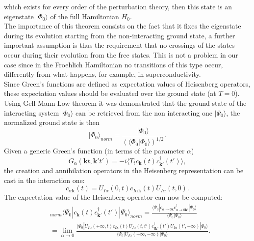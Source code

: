 which exists for every order of the perturbation theory, then this state is an eigenstate $|\Phi_0\rangle$ of the full Hamiltonian $H_0$.\\
The importance of this theorem consists on the fact that it fixes the eigenstate during its evolution starting from the non-interacting ground 
state, a further important assumption is thus the requirement that no crossings of the states occur during their evolution from the free states. This is not 
a problem in our case since in the Froehlich Hamiltonian no transitions of this type occur, differently from what happens, for example, 
in superconductivity.\\
Since Green's functions are defined as expectation values of Heisenberg operators, these expectation values should be evaluated over the ground state (at $T=0$). 
Using Gell-Mann-Low theorem it was demonstrated that the ground state of the interacting system $|\Phi_0\rangle$ can be retrieved from the non interacting one $|\Psi_0\rangle$, 
the normalized ground state is then
\begin{equation}
    |\Phi_0\rangle_{norm}=\frac{|\Phi_0\rangle}{\left(\langle \Phi_0|\Phi_0\rangle\right)^{1/2}}.
\end{equation}
Given a generic Green's function (in terms of the parameter $\alpha$)
\begin{equation}
    G_\alpha(\mathbf{k}t,\mathbf{k}'t')=-i\langle T_t c_{\mathbf{k}}(t)c^\dagger_{\mathbf{k}'}(t')\rangle,
\end{equation}
the creation and annihilation operators in the Heisenberg representation can be cast in the interaction one:
\begin{equation}
    c_{\alpha\mathbf{k}}(t)=U_{I\alpha}(0,t)c_{I\alpha\mathbf{k}}(t)U_{I\alpha}(t,0).
\end{equation}
The expectation value of the Heisenberg operator can now be computed:
\begin{equation}
\begin{split}
    &_{norm}\langle \Psi_0|c_{\mathbf{k}}(t)c^\dagger_{\mathbf{k}'}(t')|\Psi_0\rangle_{norm}=\frac{\langle\Psi_0|c_{\alpha\to0\mathbf{k}}c^\dagger_{\alpha\to0\mathbf{k}'}|\Psi_0\rangle}{\langle\Psi_0|\Psi_0\rangle}\\
    &=\lim_{\alpha\to0}\frac{\langle\Psi_0|U_{I\alpha}(+\infty,t)c_{I\mathbf{k}}(t)U_{I\alpha}(t,t')c^\dagger_{I\mathbf{k}'}(t')U_{I\alpha}(t',-\infty)|\Psi_0\rangle}{\langle\Psi_0|U_{I\alpha}(+\infty,-\infty)|\Psi_0\rangle}.
\end{split}
\end{equation}
